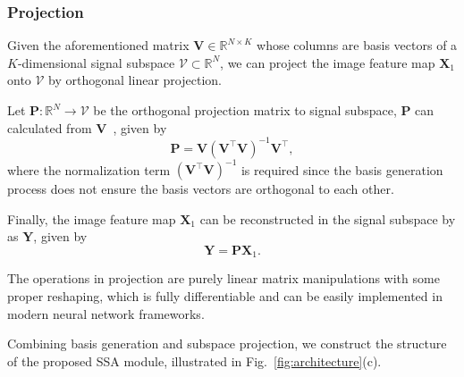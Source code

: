 \documentclass[final]{cvpr}
\newcommand{\bs}{\boldsymbol}
\newcommand{\Xa}{\bs{X}_{1}}
\newcommand{\remove}[1]{}
\begin{document}
\subsubsection{Projection}
Given the aforementioned matrix $\bs{V}\in\mathbb{R}^{N\times K}$ whose columns are basis vectors of a 
$K$-dimensional signal subspace $\mathcal{V} \subset \mathbb{R}^{N}$, 
we can project the image feature map $\Xa$ onto $\mathcal{V}$ by orthogonal linear projection. 

Let $\bs{P}: \mathbb{R}^{N}\rightarrow \mathcal{V}$ be the orthogonal projection matrix to signal subspace, $\bs{P}$ can calculated from $\bs{V}$~\cite{meyer2000}, given by
\begin{equation}
    \bs{P} = \bs{V}(\bs{V}^\intercal\bs{V})^{-1}\bs{V}^\intercal,
\end{equation}
where the normalization term $(\bs{V}^\intercal\bs{V})^{-1}$ is required since the basis generation
process does not ensure the basis vectors are orthogonal to each other.

Finally, the image feature map $\Xa$ can be reconstructed in the signal subspace by as $\bs{Y}$, given
by
\begin{equation}
    \bs{Y} = \bs{P}\Xa \text{.}
\end{equation}

The operations in projection are purely linear matrix manipulations with some proper reshaping, which
is fully differentiable and can be easily implemented in modern neural network frameworks.

Combining basis generation and subspace projection, we construct the structure of the proposed SSA module, illustrated in Fig.~\ref{fig:architecture}(c).

\remove{
The transformation step $T$ works as change of basis. In general, the transformed feature map can be represented in the following form:
\begin{equation}
    \bs{Y} = T(\bs{V}, \Xa)
\end{equation}
Here, we take the orthogonal projection as $T$. Note that the column vectors of $\bs{\Phi}$ are all zero except $\bs{\Phi}$, the component of $\Xa$ on the $\Vec{0}$ vectors does not have any subsequent effect on the network, so we can use $\bs{U}$ as the projection matrix. From the point of view of subspace, the projection component can be viewed as a coefficient of subspace:
\begin{equation}
	\bs{C} = (\bs{V}^\intercal\bs{V})^{-1}\bs{V}^\intercal\Xa
\end{equation}
where $\mathbf{C}$ is the coefficient matrix.

Now, we need to use the subspace to reconstruct the features without the noise:
\begin{equation}
    \bs{Y} = \bs{U}\bs{C}
\end{equation}
where $\bs{Y}$ has the same size with $\Xa$. In practice, the output of the kernel function $f_{\theta}$ is $\bs{U}$. This reduces the amount of memory and computation when the input is large. 
}
\end{document}
